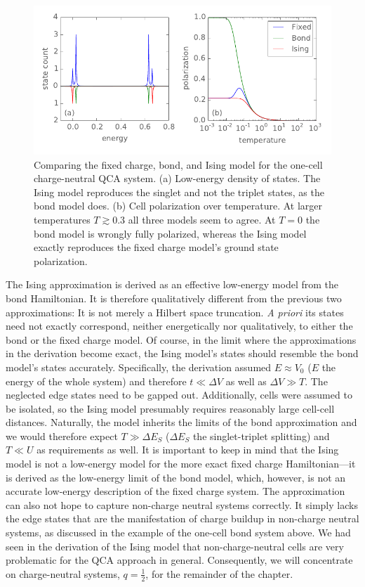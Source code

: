 %
\begin{figure}
  \center
  \includegraphics{ising_approximation1}
  \caption{
  Comparing the fixed charge, bond, and Ising model for the one-cell
  charge-neutral QCA system. (a) Low-energy density of states. The Ising model
  reproduces the singlet and not the triplet states, as the bond model does. (b)
  Cell polarization over temperature. At larger temperatures $T \gtrsim 0.3$ all
  three models seem to agree. At $T = 0$ the bond model is wrongly fully
  polarized, whereas the Ising model exactly reproduces the fixed charge model's
  ground state polarization.
  }
  \label{fig:ising_approximation1}
\end{figure}
%
The Ising approximation is derived as an effective low-energy model from the
bond Hamiltonian. It is therefore qualitatively different from the previous two
approximations: It is not merely a Hilbert space truncation. \emph{A priori} its
states need not exactly correspond, neither energetically nor qualitatively, to
either the bond or the fixed charge model. Of course, in the limit where the
approximations in the derivation become exact, the Ising model's states should
resemble the bond model's states accurately. Specifically, the derivation
assumed $E \approx V_0$ ($E$ the energy of the whole system) and therefore $t
\ll \Delta V$ as well as $\Delta V \gg T$. The neglected edge states need to be
gapped out. Additionally, cells were assumed to be isolated, so the Ising model
presumably requires reasonably large cell-cell distances. Naturally, the model
inherits the limits of the bond approximation and we would therefore expect $T
\gg \Delta E_S$ ($\Delta E_S$ the singlet-triplet splitting) and $T \ll U$ as
requirements as well. It is important to keep in mind that the Ising model is
not a low-energy model for the more exact fixed charge Hamiltonian---it is
derived as the low-energy limit of the bond model, which, however, is not an
accurate low-energy description of the fixed charge system. The approximation
can also not hope to capture non-charge neutral systems correctly. It simply
lacks the edge states that are the manifestation of charge buildup in non-charge
neutral systems, as discussed in the example of the one-cell bond system above.
We had seen in the derivation of the Ising model that non-charge-neutral cells
are very problematic for the QCA approach in general. Consequently, we will
concentrate on charge-neutral systems, $q = \frac{1}{2}$, for the remainder of
the chapter.

